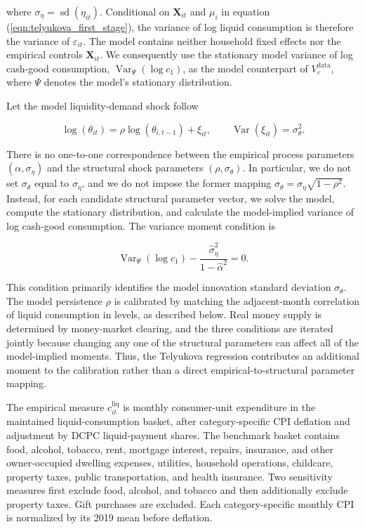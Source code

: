 \documentclass[11pt]{article}
\begin{document}
where $\sigma_\eta=\operatorname{sd}(\eta_{it})$. Conditional on $\mathbf{X}_{it}$ and $\mu_i$ in equation (\ref{eqn:telyukova_first_stage}), the variance of log liquid consumption is therefore the variance of $\varepsilon_{it}$. The model contains neither household fixed effects nor the empirical controls $\mathbf{X}_{it}$. We consequently use the stationary model variance of log cash-good consumption, $\operatorname{Var}_{\Psi}(\log c_{1})$, as the model counterpart of $V_{\varepsilon}^{\mathrm{data}}$, where $\Psi$ denotes the model's stationary distribution.

Let the model liquidity-demand shock follow

\begin{equation}
	\label{eqn:model_liquidity_shock}
	\log(\theta_{it})
	= \rho\log(\theta_{i,t-1}) + \xi_{it},
	\qquad
	\operatorname{Var}(\xi_{it})=\sigma_\theta^2.
\end{equation}

There is no one-to-one correspondence between the empirical process parameters $(\alpha,\sigma_\eta)$ and the structural shock parameters $(\rho,\sigma_\theta)$. In particular, we do not set $\sigma_\theta$ equal to $\sigma_\eta$, and we do not impose the former mapping $\sigma_\theta=\sigma_\eta\sqrt{1-\rho^2}$. Instead, for each candidate structural parameter vector, we solve the model, compute the stationary distribution, and calculate the model-implied variance of log cash-good consumption. The variance moment condition is

\begin{equation}
	\label{eqn:log_consumption_variance_moment}
	\operatorname{Var}_{\Psi}(\log c_1)
	-
	\frac{\widehat{\sigma}_\eta^2}{1-\widehat{\alpha}^2}
	=0.
\end{equation}

This condition primarily identifies the model innovation standard deviation $\sigma_\theta$. The model persistence $\rho$ is calibrated by matching the adjacent-month correlation of liquid consumption in levels, as described below. Real money supply is determined by money-market clearing, and the three conditions are iterated jointly because changing any one of the structural parameters can affect all of the model-implied moments. Thus, the Telyukova regression contributes an additional moment to the calibration rather than a direct empirical-to-structural parameter mapping.

The empirical measure $c^{\mathrm{liq}}_{it}$ is monthly consumer-unit expenditure in the maintained liquid-consumption basket, after category-specific CPI deflation and adjustment by DCPC liquid-payment shares. The benchmark basket contains food, alcohol, tobacco, rent, mortgage interest, repairs, insurance, and other owner-occupied dwelling expenses, utilities, household operations, childcare, property taxes, public transportation, and health insurance. Two sensitivity measures first exclude food, alcohol, and tobacco and then additionally exclude property taxes. Gift purchases are excluded. Each category-specific monthly CPI is normalized by its 2019 mean before deflation.
\end{document}
